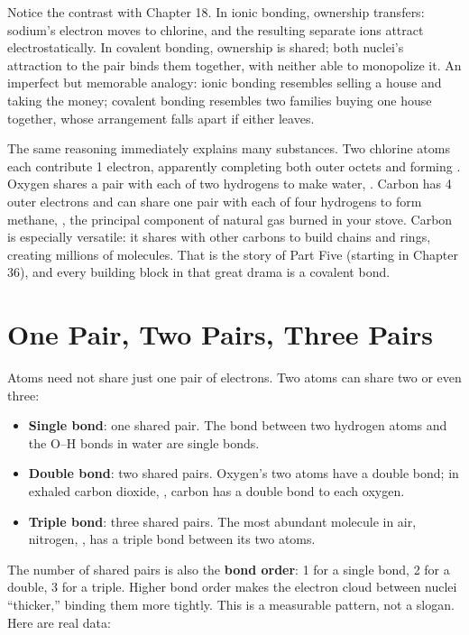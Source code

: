 Notice the contrast with Chapter 18. In ionic bonding, ownership transfers: sodium's electron moves to chlorine, and the resulting separate ions attract electrostatically. In covalent bonding, ownership is shared; both nuclei's attraction to the pair binds them together, with neither able to monopolize it. An imperfect but memorable analogy: ionic bonding resembles selling a house and taking the money; covalent bonding resembles two families buying one house together, whose arrangement falls apart if either leaves.

The same reasoning immediately explains many substances. Two chlorine atoms each contribute 1 electron, apparently completing both outer octets and forming . Oxygen shares a pair with each of two hydrogens to make water, . Carbon has 4 outer electrons and can share one pair with each of four hydrogens to form methane, , the principal component of natural gas burned in your stove. Carbon is especially versatile: it shares with other carbons to build chains and rings, creating millions of molecules. That is the story of Part Five (starting in Chapter 36), and every building block in that great drama is a covalent bond.

\section{One Pair, Two Pairs, Three Pairs}

Atoms need not share just one pair of electrons. Two atoms can share two or even three:

\begin{itemize}[itemsep=2pt]
\item \textbf{Single bond}: one shared pair. The bond between two hydrogen atoms and the O--H bonds in water are single bonds.
\item \textbf{Double bond}: two shared pairs. Oxygen's two atoms have a double bond; in exhaled carbon dioxide, , carbon has a double bond to each oxygen.
\item \textbf{Triple bond}: three shared pairs. The most abundant molecule in air, nitrogen, , has a triple bond between its two atoms.
\end{itemize}

The number of shared pairs is also the \textbf{bond order}: 1 for a single bond, 2 for a double, 3 for a triple. Higher bond order makes the electron cloud between nuclei ``thicker,'' binding them more tightly. This is a measurable pattern, not a slogan. Here are real data:

